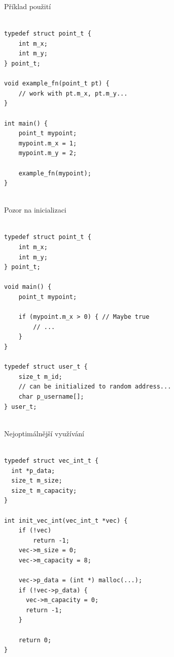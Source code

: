 \documentclass{beamer}
\begin{document}
\begin{frame}[fragile]{Příklad použití}

{\small
\begin{verbatim}

typedef struct point_t {
    int m_x;
    int m_y;
} point_t;

void example_fn(point_t pt) {
    // work with pt.m_x, pt.m_y...
}

int main() {
    point_t mypoint;
    mypoint.m_x = 1;
    mypoint.m_y = 2;

    example_fn(mypoint);
}
    
\end{verbatim}
}
    
\end{frame}

\begin{frame}[fragile]{Pozor na inicializaci}

{\small
\begin{verbatim}

typedef struct point_t {
    int m_x;
    int m_y;
} point_t;

void main() {
    point_t mypoint;

    if (mypoint.m_x > 0) { // Maybe true
        // ...
    }
}

typedef struct user_t {
    size_t m_id;
    // can be initialized to random address...
    char p_username[];
} user_t;
    
\end{verbatim}
}

\end{frame}

\begin{frame}[fragile]{Nejoptimálnější využívání}

{\small
\begin{verbatim}

typedef struct vec_int_t {
  int *p_data;
  size_t m_size;
  size_t m_capacity;
}

int init_vec_int(vec_int_t *vec) {
    if (!vec)
        return -1;
    vec->m_size = 0;
    vec->m_capacity = 8;
    
    vec->p_data = (int *) malloc(...);
    if (!vec->p_data) {
      vec->m_capacity = 0;
      return -1;
    }

    return 0;
}

\end{verbatim}
}

\end{frame}
\end{document}
